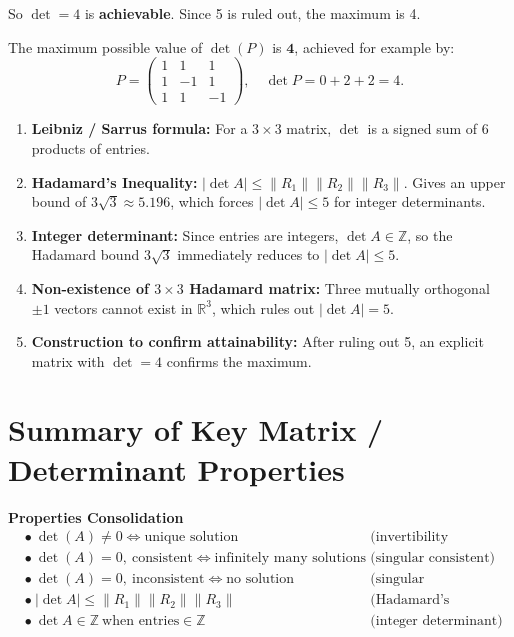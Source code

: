 \documentclass[12pt]{article}
\begin{document}
So $\det = 4$ is \textbf{achievable}. Since 5 is ruled out, the maximum is 4.

\begin{answerbox}
The maximum possible value of $\det(P)$ is $\mathbf{4}$, achieved for example by:
\[
P = \begin{pmatrix} 1 & 1 & 1 \\ 1 & -1 & 1 \\ 1 & 1 & -1 \end{pmatrix}, \quad \det P = 0 + 2 + 2 = 4.
\]
\end{answerbox}

\begin{propbox}
\begin{enumerate}[leftmargin=*, label=\textbf{P\arabic*.}]
  \item \textbf{Leibniz / Sarrus formula:} For a $3\times 3$ matrix, $\det$ is a signed sum of 6 products of entries.
  \item \textbf{Hadamard's Inequality:} $|\det A| \leq \|R_1\|\|R_2\|\|R_3\|$. Gives an upper bound of $3\sqrt{3} \approx 5.196$, which forces $|\det A| \leq 5$ for integer determinants.
  \item \textbf{Integer determinant:} Since entries are integers, $\det A \in \mathbb{Z}$, so the Hadamard bound $3\sqrt{3}$ immediately reduces to $|\det A| \leq 5$.
  \item \textbf{Non-existence of $3\times 3$ Hadamard matrix:} Three mutually orthogonal $\pm 1$ vectors cannot exist in $\mathbb{R}^3$, which rules out $|\det A| = 5$.
  \item \textbf{Construction to confirm attainability:} After ruling out 5, an explicit matrix with $\det = 4$ confirms the maximum.
\end{enumerate}
\end{propbox}

\section*{Summary of Key Matrix / Determinant Properties}

\begin{mdframed}[backgroundcolor=boxbg, linecolor=problemblue, linewidth=1pt]
\textbf{Properties Consolidation}
\begin{align*}
&\bullet\ \det(A) \neq 0 \Leftrightarrow \text{unique solution} && \text{(invertibility criterion)}\\
&\bullet\ \det(A) = 0,\ \text{consistent} \Leftrightarrow \text{infinitely many solutions} && \text{(singular consistent)}\\
&\bullet\ \det(A) = 0,\ \text{inconsistent} \Leftrightarrow \text{no solution} && \text{(singular inconsistent)}\\
&\bullet\ |\det A| \leq \|R_1\|\|R_2\|\|R_3\| && \text{(Hadamard's inequality)}\\
&\bullet\ \det A \in \mathbb{Z}\ \text{when entries} \in \mathbb{Z} && \text{(integer determinant)}
\end{align*}
\end{mdframed}
\end{document}
